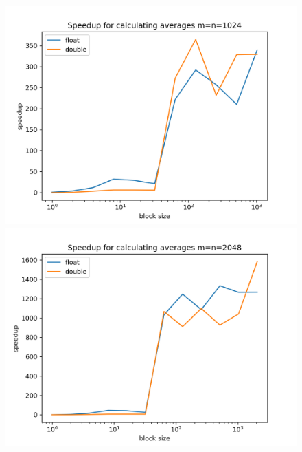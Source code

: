 \documentclass[a4paper]{article}
\begin{document}
	\begin{figure}[h!]
		\centering
		\begin{minipage}{0.45\linewidth}
			\centering
			\includegraphics[width=\linewidth]{../comparison_plots/reduce_plot_m1024.png}
		\end{minipage}%
		\begin{minipage}{0.45\linewidth}
			\centering
			\includegraphics[width=\linewidth]{../comparison_plots/reduce_plot_m2048.png}
		\end{minipage}
		\vspace{0.5cm} %
		\begin{minipage}{0.45\linewidth}
			\centering

\end{minipage}
\end{figure}
\end{document}
